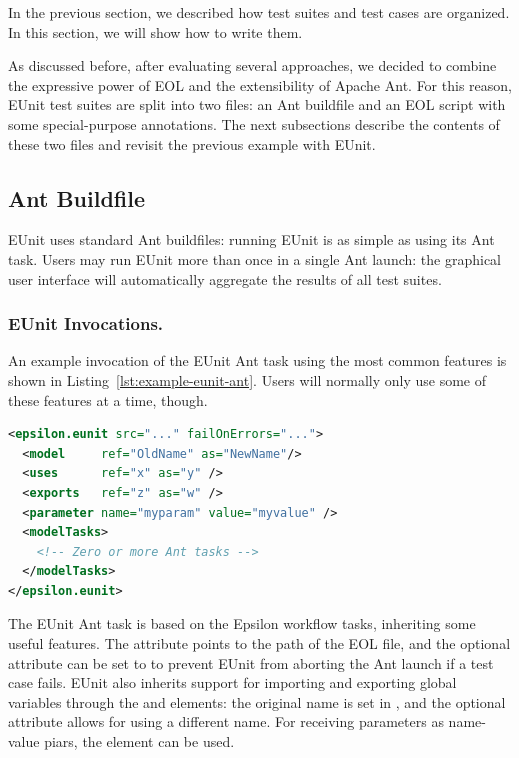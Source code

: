 In the previous section, we described how test suites and test cases are organized. In this section, we will show how to write them.

As discussed before, after evaluating several approaches, we decided to combine the expressive power of EOL and the extensibility of Apache Ant. For this reason, EUnit test suites are split into two files: an Ant buildfile and an EOL script with some special-purpose annotations. The next subsections describe the contents of these two files and revisit the previous example with EUnit.

\subsection{Ant Buildfile}

EUnit uses standard Ant buildfiles: running EUnit is as simple as using its Ant task. Users may run EUnit more than once in a single Ant launch: the graphical user interface will automatically aggregate the results of all test suites.

\subsubsection{EUnit Invocations.} An example invocation of the EUnit Ant task using the most common features is shown in Listing~\ref{lst:example-eunit-ant}. Users will normally only use some of these features at a time, though.

\begin{lstlisting}[language=XML,columns=fixed,caption=Example invocation of the EUnit Ant task,label=lst:example-eunit-ant,float]
<epsilon.eunit src="..." failOnErrors="...">
  <model     ref="OldName" as="NewName"/>
  <uses      ref="x" as="y" />
  <exports   ref="z" as="w" />
  <parameter name="myparam" value="myvalue" />
  <modelTasks>
    <!-- Zero or more Ant tasks -->
  </modelTasks>
</epsilon.eunit>
\end{lstlisting}

The EUnit Ant task is based on the Epsilon workflow tasks, inheriting some useful features. The attribute  points to the path of the EOL file, and the optional attribute  can be set to  to prevent EUnit from aborting the Ant launch if a test case fails. EUnit also inherits support for importing and exporting global variables through the  and  elements: the original name is set in , and the optional  attribute allows for using a different name. For receiving parameters as name-value piars, the  element can be used.


